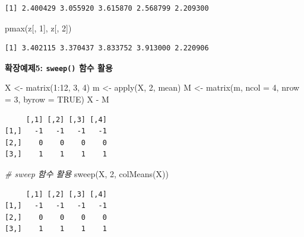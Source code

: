 \documentclass[
  11pt,
]{krantz}
\newenvironment{Shaded}{\begin{snugshade}}{\end{snugshade}}
\newcommand{\AttributeTok}[1]{\textcolor[rgb]{0.61,0.61,0.61}{#1}}
\newcommand{\CommentTok}[1]{\textcolor[rgb]{0.37,0.37,0.37}{\textit{#1}}}
\newcommand{\ConstantTok}[1]{\textcolor[rgb]{0,0,0}{#1}}
\newcommand{\DecValTok}[1]{\textcolor[rgb]{0.06,0.06,0.06}{#1}}
\newcommand{\FunctionTok}[1]{\textcolor[rgb]{0,0,0}{#1}}
\newcommand{\NormalTok}[1]{#1}
\newcommand{\OtherTok}[1]{\textcolor[rgb]{0.37,0.37,0.37}{#1}}
\newcommand{\SpecialCharTok}[1]{\textcolor[rgb]{0,0,0}{#1}}
\begin{document}
\begin{verbatim}
[1] 2.400429 3.055920 3.615870 2.568799 2.209300
\end{verbatim}

\begin{Shaded}
\begin{Highlighting}[]
\FunctionTok{pmax}\NormalTok{(z[, }\DecValTok{1}\NormalTok{], z[, }\DecValTok{2}\NormalTok{])}
\end{Highlighting}
\end{Shaded}

\begin{verbatim}
[1] 3.402115 3.370437 3.833752 3.913000 2.220906
\end{verbatim}

\normalsize

\textbf{확장예제5: \texttt{sweep()} 함수 활용}

\footnotesize

\begin{Shaded}
\begin{Highlighting}[]
\NormalTok{X }\OtherTok{\textless{}{-}} \FunctionTok{matrix}\NormalTok{(}\DecValTok{1}\SpecialCharTok{:}\DecValTok{12}\NormalTok{, }\DecValTok{3}\NormalTok{, }\DecValTok{4}\NormalTok{)}
\NormalTok{m }\OtherTok{\textless{}{-}} \FunctionTok{apply}\NormalTok{(X, }\DecValTok{2}\NormalTok{, mean)}
\NormalTok{M }\OtherTok{\textless{}{-}} \FunctionTok{matrix}\NormalTok{(m, }\AttributeTok{ncol =} \DecValTok{4}\NormalTok{, }\AttributeTok{nrow =} \DecValTok{3}\NormalTok{, }\AttributeTok{byrow =} \ConstantTok{TRUE}\NormalTok{)}
\NormalTok{X }\SpecialCharTok{{-}}\NormalTok{ M}
\end{Highlighting}
\end{Shaded}

\begin{verbatim}
     [,1] [,2] [,3] [,4]
[1,]   -1   -1   -1   -1
[2,]    0    0    0    0
[3,]    1    1    1    1
\end{verbatim}

\begin{Shaded}
\begin{Highlighting}[]
\CommentTok{\# sweep 함수 활용}
\FunctionTok{sweep}\NormalTok{(X, }\DecValTok{2}\NormalTok{, }\FunctionTok{colMeans}\NormalTok{(X))}
\end{Highlighting}
\end{Shaded}

\begin{verbatim}
     [,1] [,2] [,3] [,4]
[1,]   -1   -1   -1   -1
[2,]    0    0    0    0
[3,]    1    1    1    1
\end{verbatim}
\end{document}
